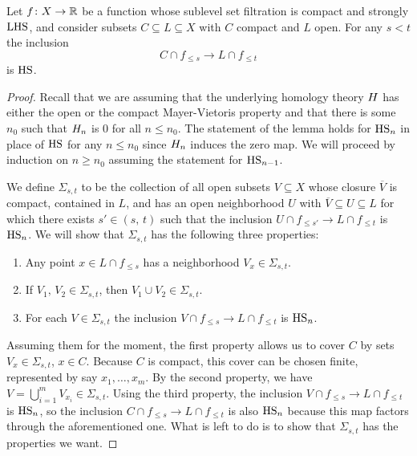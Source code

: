 \begin{lem} \label{l:key lemma for q-tameness}
    Let $f \colon X \to \mathbb{R}$ be a function whose sublevel set filtration is compact and strongly $\mathrm{LHS}$, and consider subsets $C \subseteq L \subseteq X$ with $C$ compact and $L$ open.
	For any $s < t$ the inclusion
	\begin{equation*}
	C \cap f_{\leq s} \to L \cap f_{\leq t}
	\end{equation*}
	is $\mathrm{HS}$.
\end{lem}

\begin{proof}
	Recall that we are assuming that the underlying homology theory $H$ has either the open or the compact Mayer-Vietoris property and that there is some $n_0$ such that $H_{n}$ is 0 for all $n \leq n_0$.
    The statement of the lemma holds for $\mathrm{HS}_{n}$ in place of $\mathrm{HS}$ for any $n \leq n_0$ since $H_{n}$ induces the zero map.
    We will proceed by induction on $n \geq n_0$ assuming the statement for $\mathrm{HS}_{n-1}$.

    We define $\Sigma_{s, t}$ to be the collection of all open subsets $V \subseteq X$ whose closure $\overline{V}$ is compact, contained in $L$, and has an open neighborhood $U$ with 
	$\overline{V} \subseteq U \subseteq L$
	for which there exists $s' \in (s,\, t)$ such that the inclusion
    $U \cap f_{\leq s'} \to L \cap f_{\leq t}$
	is $\mathrm{HS}_n$.
	We will show that $\Sigma_{s, t}$ has the following three properties:
	\begin{enumerate}
	    \item Any point $x \in L \cap f_{\leq s}$ has a neighborhood $V_x \in \Sigma_{s,t}$.
	    \item If $V_1,\, V_2 \in \Sigma_{s,t}$, then $V_1 \cup V_2 \in \Sigma_{s,t}$.
	    \item For each $V \in \Sigma_{s,t}$ the inclusion 
	    $V \cap f_{\leq s} \to L \cap f_{\leq t}$ 
	    is $\mathrm{HS}_n$.
	\end{enumerate}
	
	Assuming them for the moment, the first property allows us to cover $C$ by sets $V_x \in \Sigma_{s,t}$, $x \in C$.
	Because $C$ is compact, this cover can be chosen finite, represented by say $x_1,\dots, x_m$.
	By the second property, we have $V = \bigcup_{i = 1}^m V_{x_i} \in \Sigma_{s,t}$.
	Using the third property, the inclusion 
	$V \cap f_{\leq s} \to L \cap f_{\leq t}$ 
	is $\mathrm{HS}_n$, so the inclusion 
	$C \cap f_{\leq s} \to L \cap f_{\leq t}$ 
	is also $\mathrm{HS}_n$ because this map factors through the aforementioned one.
	What is left to do is to show that $\Sigma_{s,t}$ has the properties we want.
	

\end{proof}
